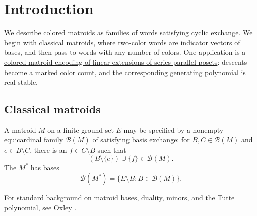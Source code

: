 
\section[introduction]{Introduction}

We describe colored matroids as families of words satisfying cyclic exchange.
We begin with classical matroids, where two-color words are indicator vectors
of bases, and then pass to words with any number of colors.
One application is a \href{series-parallel.htm}{colored-matroid encoding of
linear extensions of series-parallel posets}: descents become a marked
color count, and the corresponding generating polynomial is real stable.

\subsection[classicalMatroids]{Classical matroids}

\begin{definition}
A matroid $M$ on a finite ground set $E$ may be specified by a nonempty
equicardinal family $\mathcal B(M)$ of  satisfying basis
exchange: for $B,C\in\mathcal B(M)$ and $e\in B\setminus C$, there is an
$f\in C\setminus B$ such that
\[
 (B\setminus\{e\})\cup\{f\}\in\mathcal B(M).
\]
The  $M^*$ has bases
\[
 \mathcal B(M^*)=\{E\setminus B:B\in\mathcal B(M)\}.
\]
\end{definition}

For standard background on matroid bases, duality, minors, and the Tutte
polynomial, see Oxley \cite{Oxley2011}.

